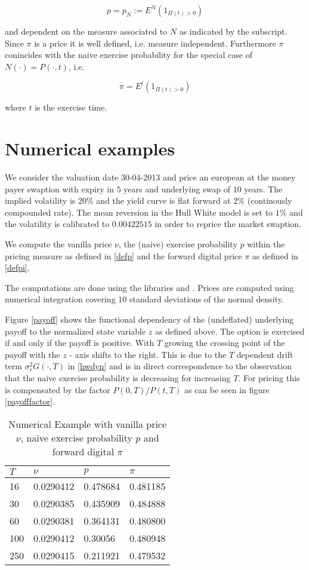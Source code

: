 \documentclass{amsart}
\theoremstyle{plain}
\numberwithin{equation}{section}
\begin{document}
\begin{equation}\label{defp}
p = p_N := E^N(1_{\Pi(t)>0})
\end{equation}

and dependent on the measure associated to $N$ as indicated by the subscript. Since $\pi$ is a price it is well defined, i.e. measure independent. Furthermore $\pi$ conincides with the naive exercise probability for the special case of $N(\cdot)=P(\cdot,t)$, i.e.

\begin{equation}
\pi = E^t ( 1_{\Pi(t)>0} )
\end{equation}

where $t$ is the exercise time.

\section{Numerical examples}

We consider the valuation date 30-04-2013 and price an european at the money payer swaption with expiry in $5$ years and underlying swap of $10$ years.
The implied volatility is $20\%$ and the yield curve is flat forward at $2\%$ (continously compounded rate). The mean reversion in the Hull White
model is set to $1\%$ and the volatility is calibrated to $0.00422515$ in order to reprice the market swaption.

We compute the vanilla price $\nu$, the (naive) exercise probability $p$ within the pricing measure as defined in \ref{defp} and the forward digital price $\pi$ as defined in \ref{defpi}.

The computations are done using the libraries \cite{ql} and \cite{ntl}. Prices are computed using numerical integration covering $10$ standard deviations of the normal density.

Figure \ref{payoff} shows the functional dependency of the (undeflated) underlying payoff to the normalized state variable $z$ as defined above. The option is exercised if and only if the payoff is positive. With $T$ growing the crossing point of the payoff with the $z$ - axis shifts to the right. This is due to the $T$ dependent drift term $\sigma_r^2 G(\cdot,T)$ in \ref{hwdyn} and is in direct correspondence to the observation that the naive exercise probability is decreasing for increasing $T$. For pricing this is compensated by the factor $P(0,T)/P(t,T)$ as can be seen in figure \ref{payofffactor}.

\begin{table}[ht]
\caption{Numerical Example with vanilla price $\nu$, naive exercise probability $p$ and forward digital $\pi$}
\begin{tabular}{l | l | l | l}
$T$ & $\nu$ & $p$ & $\pi$ \\ \hline
16 & 0.0290412 & 0.478684 & 0.481185 \\
30 & 0.0290385 & 0.435909 & 0.484888 \\
60 & 0.0290381 & 0.364131 & 0.480800 \\
100 & 0.0290412 & 0.30056 & 0.480948 \\
250 & 0.0290415 & 0.211921 & 0.479532
\end{tabular}
\label{numex}
\end{table}
\end{document}
